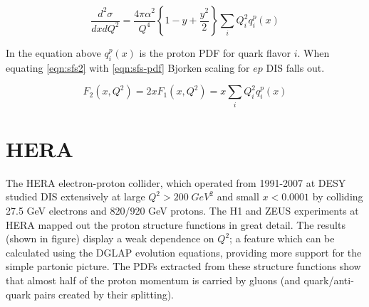 \begin{equation}
	\label{eqn:sfs-pdf}
	\frac{d^2\sigma}{dx dQ^2} = \frac{4 \pi \alpha^2}{Q^4} \left\lbrace 1 - y + \frac{y^2}{2} \right\rbrace \sum_{i} Q_i^2 q_i^p (x)
\end{equation}

In the equation above $q_i^p (x)$ is the proton PDF for quark flavor $i$.  When equating \ref{eqn:sfs2} with \ref{eqn:sfs-pdf} Bjorken scaling for $ep$ DIS falls out.

\begin{equation}
	\label{eqn:bjorken-scaling}
	F_{2} (x, Q^2) = 2xF_1 (x, Q^2) = x \sum_{i} Q_i^2 q_i^p(x)
\end{equation}

\section{HERA}
The HERA electron-proton collider, which operated from 1991-2007 at DESY studied DIS extensively at large $Q^2 > 200 \; GeV^2$ and small $x < 0.0001$ by colliding 27.5 GeV electrons and 820/920 GeV protons.  The H1 and ZEUS experiments at HERA mapped out the proton structure functions in great detail.  The results (shown in figure) display a weak dependence on $Q^2$; a feature which can be calculated using the DGLAP evolution equations, providing more support for the simple partonic picture.  The PDFs extracted from these structure functions show that almost half of the proton momentum is carried by gluons (and quark/anti-quark pairs created by their splitting).   

